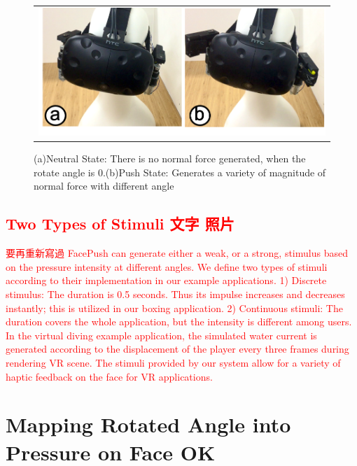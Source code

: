 \begin{figure}[h]
\begin{center}
    \begin{tabular}{@{\hspace{0.1cm}}c}
    \includegraphics[width=1\textwidth]{figures/2_StatesOfFacePush.png}
    \end{tabular}
    \caption{(a)Neutral State: There is no normal force generated, when the rotate angle is 0.(b)Push State: Generates a variety of magnitude of normal force with different angle}
    \label{fig:2_States}
    \end{center}
\end{figure}

\subsection{\textcolor{red}{Two Types of Stimuli 文字 照片}}

\textcolor{red}{ 要再重新寫過 FacePush can generate either a weak, or a strong, stimulus based on the pressure intensity at different angles. We define two types of stimuli according to their implementation in our example applications. 1) Discrete stimulus: The duration is 0.5 seconds. Thus its impulse increases and decreases instantly; this is utilized in our boxing application. 2) Continuous stimuli: The duration covers the whole application, but the intensity is different among users. In the virtual diving example application, the simulated water current is generated according to the displacement of the player every three frames during rendering VR scene. The stimuli provided by our system allow for a variety of haptic feedback on the face for VR applications. }

\section{Mapping Rotated Angle into Pressure on Face OK}

